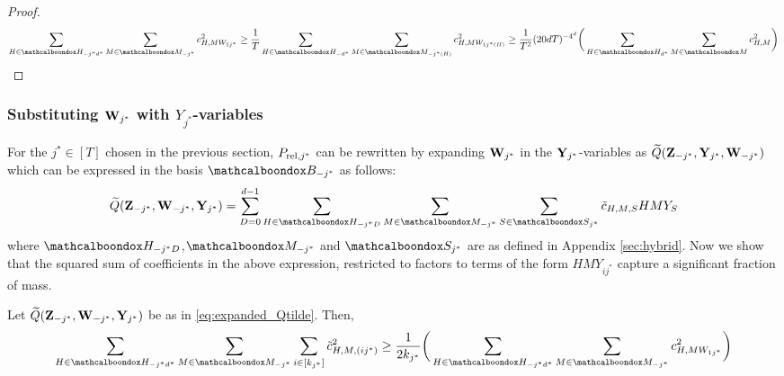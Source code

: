 \begin{proof}
\begin{equation*}		
\sum_{H \in \mcb{H}_{-j^*d^*}}\sum_{M \in \mcb{M}_{-j^*}} c^2_{H,MW_{1j^*}} \ge \frac{1}{T}\sum_{H \in \mcb{H}_{-d^*}}\sum_{M \in \mcb{M}_{-j^*(H)}}c^2_{H,MW_{1j^*(H)}} \ge \frac{1}{T^2}(20dT)^{-4^d}\bigg(\sum_{H \in \mcb{H}_{d^*}}\sum_{M \in \mcb{M}} c^2_{H,M}\bigg)
\end{equation*}

\end{proof}

\subsubsection{Substituting ${\bf W}_{j^*}$ with ${Y}_{j^*}$-variables} 

For the $j^* \in [T]$ chosen in the previous section, $P_{{\rm rel},j^*}$ can be rewritten by expanding ${\bf W}_{j^*}$ in the ${\bf Y}_{j^*}$-variables as $\Wq({\bf Z}_{-j^*},{\bf Y}_{j^*},{\bf W}_{-j^*})$ which can be expressed in the basis $\mcb{B}_{-j^*}$ as follows:
\begin{equation}				\label{eq:expanded_Qtilde}				
\Wq({\bf Z}_{-j^*},{{\bf W}_{- j^*}},{\bf Y}_{j^*}) = \sum_{D = 0}^{d-1}\sum_{H \in \mcb{H}_{-j^*D}}\sum_{M \in \mcb{M}_{-j^*}}\sum_{S \in \mcb{S}_{j^*}}\tilde{c}_{H,M,S}HMY_S 
\end{equation}
	where $\mcb{H}_{-j^*D}$,$\mcb{M}_{-j^*}$ and $\mcb{S}_{j^*}$ are as defined in Appendix \ref{sec:hybrid}. Now we show that the squared sum of coefficients in the above expression, restricted to factors to terms of the form $HMY_{ij^*}$ capture a significant fraction of mass. 
\begin{cl}					\label{cl:W-to-Y}
	Let $\Wq({\bf Z}_{-j^*},{{\bf W}_{- j^*}},{\bf Y}_{j^*})$ be as in   \eqref{eq:expanded_Qtilde}. Then,
	\begin{equation}					
	 \sum_{H \in \mcb{H}_{-j^*d^*} }\sum_{M \in \mcb{M}_{-j^*}}\sum_{i \in [k_{j^*}]}\tilde{c}^2_{H,M,({ij^*})} \ge \frac{1}{2k_{j^*}}\bigg(\sum_{H \in \mcb{H}_{-j^*d^*}}\sum_{M \in \mcb{M}_{-j^*}} c^2_{H,MW_{1j^*}}\bigg)				\label{eq:Qtilde-lower-bound}
	\end{equation}
\end{cl}
